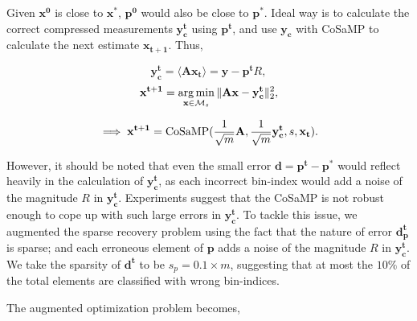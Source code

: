  
 Given $\mathbf{x^0}$ is close to $\mathbf{x^*}$, $\mathbf{p^0}$ would also be close to $\mathbf{p^*}$. Ideal way is to calculate the correct compressed measurements $\mathbf{y^t_c}$ using $\mathbf{p^t}$, and use $\mathbf{y_c}$ with CoSaMP to calculate the next estimate $\mathbf{{x}_{t+1}}$. Thus,


$$
\mathbf{y^t_c} = \langle \mathbf{A}\mathbf{x_{t}} \rangle = \mathbf{y} - \mathbf{p^t}R,
$$
$$
\mathbf{{x}^{t+1}} = \argmin_{\mathbf{x} \in \mathcal{M}_s}\norm{\mathbf{Ax} - \mathbf{y^t_c}}_2^2, %
$$

\begin{equation}
\implies \mathbf{{x}^{t+1}} = \mathrm{CoSaMP}(\frac{1}{\sqrt{m}}\mathbf{A},\frac{1}{\sqrt{m}}\mathbf{y^t_c},s,\mathbf{x_t}).
\label{eq:cosamp}
\end{equation}


 However, it should be noted that even the small error $\mathbf{d} = \mathbf{p^t - p^*}$ would reflect heavily in the calculation of $\mathbf{y^t_c}$, as each incorrect bin-index would add a noise of the magnitude $R$ in $\mathbf{y^t_c}$. Experiments suggest that the CoSaMP is not robust enough to cope up with such large errors in $\mathbf{y^t_c}$. To tackle this issue, we augmented the sparse recovery problem using the fact that the nature of error $\mathbf{d^t_p}$ is sparse; and each erroneous element of $\mathbf{p}$ adds a noise of the magnitude $R$ in $\mathbf{y^t_c}$. We take the sparsity of $\mathbf{d^t}$ to be $s_p = 0.1\times m$, suggesting that at most the $10\%$ of the total elements are classified with wrong bin-indices.
 
 The augmented optimization problem becomes,
  
